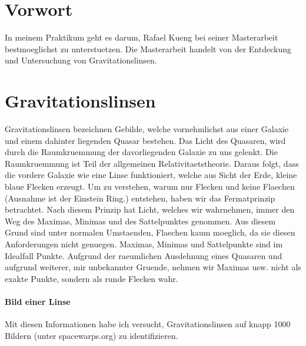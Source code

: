 \documentclass[pdftex,12pt,a4paper]{article}
\begin{document}





\section{Vorwort}

In meinem Praktikum geht es darum, Rafael Kueng bei seiner Masterarbeit bestmoeglichst zu unterstuetzen.
Die Masterarbeit handelt von der Entdeckung und Untersuchung von Gravitationslinsen.

\section {Gravitationslinsen}

Gravitationslinsen bezeichnen Gebilde, welche vornehmlichst aus einer Galaxie und einem dahinter liegenden Quasar bestehen.
Das Licht des Quasaren, wird durch die Raumkruemmung der davorliegenden Galaxie zu uns gelenkt.
Die Raumkruemmung ist Teil der allgemeinen Relativitaetstheorie.
Daraus folgt, dass die vordere Galaxie wie eine Linse funktioniert, welche aus Sicht der Erde, kleine blaue Flecken erzeugt.
Um zu verstehen, warum nur Flecken und keine Flaechen (Ausnahme ist der Einstein Ring.) entstehen, haben wir das Fermatprinzip betrachtet.
Nach diesem Prinzip hat Licht, welches wir wahrnehmen, immer den Weg des Maximas, Minimas und des Sattelpunktes genommen.
Aus diesem Grund sind unter normalen Umstaenden, Flaechen kaum moeglich, da sie diesen Anforderungen nicht genuegen.
Maximas, Minimas und Sattelpunkte sind im Idealfall Punkte. Aufgrund der raeumlichen Ausdehnung eines Quasaren und aufgrund weiterer,
mir unbekannter Gruende, nehmen wir Maximas usw. nicht als exakte Punkte, sondern als runde Flecken wahr. 

\paragraph{Bild einer Linse}

Mit diesen Informationen habe ich versucht, Gravitationslinsen auf knapp 1000 Bildern (unter spacewarps.org) zu identifizieren.
\end{document}
